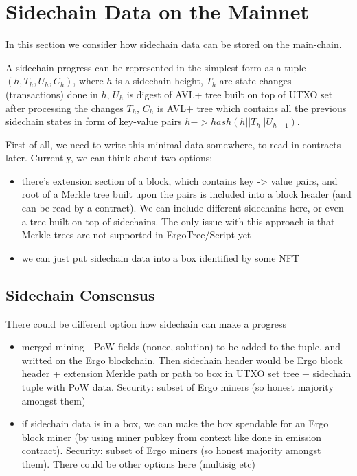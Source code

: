 \documentclass{article}   %
\begin{document}
\section{Sidechain Data on the Mainnet}

In this section we consider how sidechain data can be stored on the main-chain.

A sidechain progress can be represented in the simplest form as a tuple $(h, T_h, U_h, C_h)$, where
$h$ is a sidechain height, $T_h$ are state changes (transactions) done in $h$, $U_h$ is digest of AVL+ tree built on top
of UTXO set after processing the changes $T_h$, $C_h$ is AVL+ tree which contains all the previous sidechain states in form
of key-value pairs $h -> hash(h || T_h || U_{h-1})$.

First of all, we need to write this minimal data somewhere, to read in contracts later. Currently, we can think about two options:

\begin{itemize}
\item{} there's extension section of a block, which contains key -> value pairs, and root of a Merkle tree built upon the pairs is included into a
block header (and can be read by a contract). We can include different sidechains here, or even a tree built on top of sidechains. The only issue with this approach is that Merkle trees are not supported in ErgoTree/Script yet

\item{} we can just put sidechain data into a box identified by some NFT
\end{itemize}

\subsection{Sidechain Consensus}


There could be different option how sidechain can make a progress
\begin{itemize}
\item{} merged mining - PoW fields (nonce, solution) to be added to the tuple, and writted on the Ergo blockchain. Then sidechain header would be Ergo block header + extension Merkle path or path to box in UTXO set tree + sidechain tuple with PoW data. Security: subset of Ergo miners (so honest majority amongst them)

\item{} if sidechain data is in a box, we can make the box spendable for an Ergo block miner (by using miner pubkey from context like done in emission contract). Security: subset of Ergo miners (so honest majority amongst them). There could be other options here (multisig etc)
\end{itemize}
\end{document}
